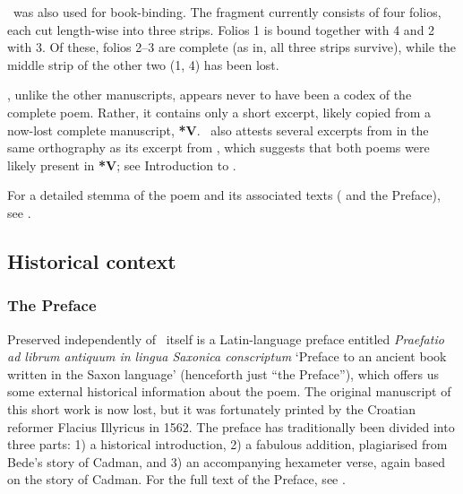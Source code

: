 \SFragHeli\ was also used for book-binding.  The fragment currently consists of four folios, each cut length-wise into three strips.  Folios 1 is bound together with 4 and 2 with 3.  Of these, folios 2--3 are complete (as in, all three strips survive), while the middle strip of the other two (1, 4) has been lost.

\Vaticanus, unlike the other manuscripts, appears never to have been a codex of the complete poem.  Rather, it contains only a short excerpt, likely copied from a now-lost complete manuscript, \textbf{*V}.  \Vaticanus\ also attests several excerpts from  in the same orthography as its excerpt from \Heliand, which suggests that both poems were likely present in \textbf{*V}; see Introduction to .

For a detailed stemma of the poem and its associated texts ( and the Preface), see \textcite[20]{Price2010}.

\subsection{Historical context}

\subsubsection{The Preface}

Preserved independently of \Heliand\ itself is a Latin-language preface entitled \emph{Praefatio ad librum antiquum in lingua Saxonica conscriptum} ‘Preface to an ancient book written in the Saxon language’ (henceforth just “the Preface”), which offers us some external historical information about the poem.  The original manuscript of this short work is now lost, but it was fortunately printed by the Croatian reformer Flacius Illyricus in 1562.  The preface has traditionally been divided into three parts: 1) a historical introduction, 2) a fabulous addition, plagiarised from Bede’s story of Cadman, and 3) an accompanying hexameter verse, again based on the story of Cadman.  For the full text of the Preface, see \textcite[3--6]{Sievers1878}.

